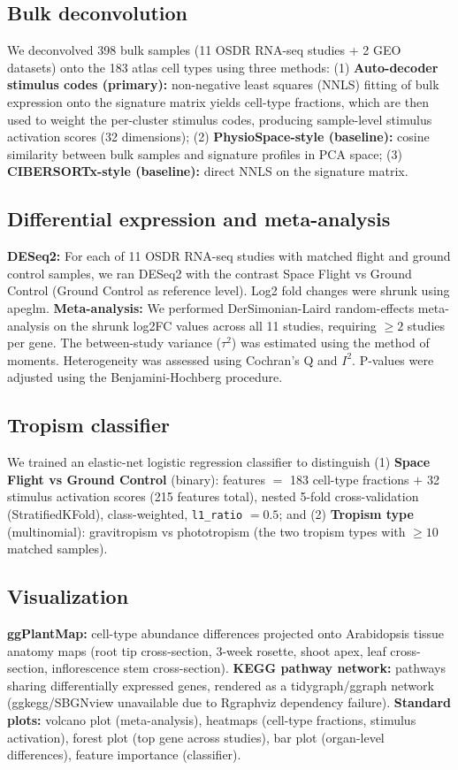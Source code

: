 \documentclass[pdflatex,sn-nature]{sn-jnl}
\begin{document}
\subsection{Bulk deconvolution}
We deconvolved 398 bulk samples (11 OSDR RNA-seq studies + 2 GEO datasets) onto
the 183 atlas cell types using three methods: (1) \textbf{Auto-decoder stimulus
codes (primary):} non-negative least squares (NNLS) fitting of bulk expression
onto the signature matrix yields cell-type fractions, which are then used to
weight the per-cluster stimulus codes, producing sample-level stimulus activation
scores (32 dimensions); (2) \textbf{PhysioSpace-style (baseline):} cosine
similarity between bulk samples and signature profiles in PCA space; (3)
\textbf{CIBERSORTx-style (baseline):} direct NNLS on the signature matrix.

\subsection{Differential expression and meta-analysis}
\textbf{DESeq2:} For each of 11 OSDR RNA-seq studies with matched flight and ground
control samples, we ran DESeq2 with the contrast Space Flight vs Ground Control
(Ground Control as reference level). Log2 fold changes were shrunk using apeglm.
\textbf{Meta-analysis:} We performed DerSimonian-Laird random-effects meta-analysis
on the shrunk log2FC values across all 11 studies, requiring \(\geq 2\) studies per
gene. The between-study variance (\(\tau^2\)) was estimated using the method of
moments. Heterogeneity was assessed using Cochran's Q and \(I^2\). P-values were
adjusted using the Benjamini-Hochberg procedure.

\subsection{Tropism classifier}
We trained an elastic-net logistic regression classifier to distinguish (1)
\textbf{Space Flight vs Ground Control} (binary): features \(=\) 183 cell-type
fractions \(+\) 32 stimulus activation scores (215 features total), nested 5-fold
cross-validation (StratifiedKFold), class-weighted, \texttt{l1\_ratio} \(= 0.5\);
and (2) \textbf{Tropism type} (multinomial): gravitropism vs phototropism (the two
tropism types with \(\geq 10\) matched samples).

\subsection{Visualization}
\textbf{ggPlantMap:} cell-type abundance differences projected onto Arabidopsis
tissue anatomy maps (root tip cross-section, 3-week rosette, shoot apex, leaf
cross-section, inflorescence stem cross-section). \textbf{KEGG pathway network:}
pathways sharing differentially expressed genes, rendered as a tidygraph/ggraph
network (ggkegg/SBGNview unavailable due to Rgraphviz dependency failure).
\textbf{Standard plots:} volcano plot (meta-analysis), heatmaps (cell-type
fractions, stimulus activation), forest plot (top gene across studies), bar plot
(organ-level differences), feature importance (classifier).
\end{document}
